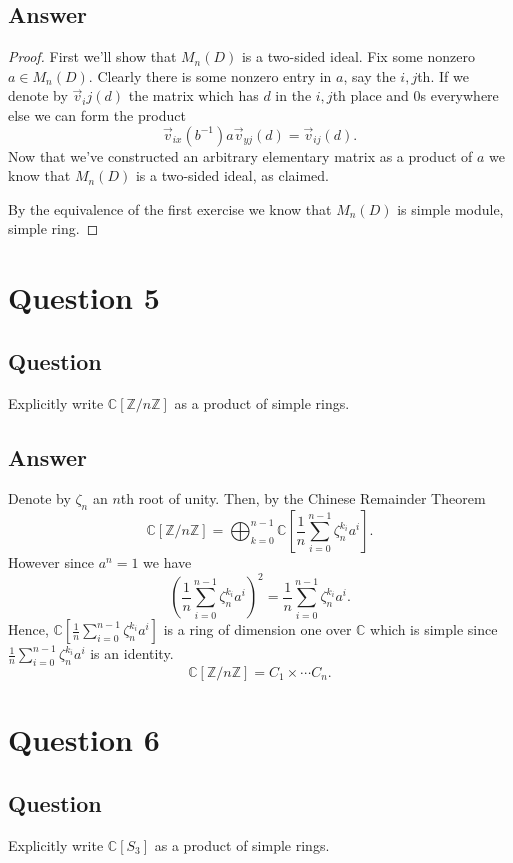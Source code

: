 \documentclass[11pt]{article}
\begin{document}
\subsection{Answer}
\begin{proof}
First we'll show that $M_n (D) $ is a two-sided ideal.  Fix some nonzero $a \in M_n(D)$. Clearly there is some nonzero entry in $a$, say the $i,j$th. If we denote by $\vec{v}_ij(d) $ the matrix which has $d$ in the $i,j$th place and 0s everywhere else we can form the product
\[\vec{v}_{ix}(b^{-1}) a \vec{v}_{yj}(d) = \vec{v}_{ij}(d).\]
Now that we've constructed an arbitrary elementary matrix as a product of $a$ we know that $M_n(D)$ is a two-sided ideal, as claimed.

By the equivalence of the first exercise we know that $M_n(D)$ is simple module, simple ring.
\end{proof}

\section{Question 5}
\subsection{Question}
Explicitly write $\mathbb{C}[\mathbb{Z}/n \mathbb{Z}]$ as a product of simple rings.
\subsection{Answer}
Denote by $\zeta_n$ an $n$th root of unity. Then, by the Chinese Remainder Theorem
\[\mathbb{C}[\mathbb{Z}/n\mathbb{Z}] = \bigoplus_{k=0}^{n-1} \mathbb{C} \left[\frac{1}{n} \sum_{i=0}^{n-1} \zeta_n^{k_i} a^i\right].\]
However since $a^n=1$ we have
\[ \left(\frac{1}{n} \sum_{i=0}^{n-1} \zeta_n^{k_i} a^i\right)^2 = \frac{1}{n} \sum_{i=0}^{n-1} \zeta_n^{k_i} a^i .\]
Hence, $\mathbb{C} \left[\frac{1}{n} \sum_{i=0}^{n-1} \zeta_n^{k_i} a^i\right]$ is  a ring of dimension one over $\mathbb{C}$ which is simple since $\frac{1}{n} \sum_{i=0}^{n-1} \zeta_n^{k_i} a^i$ is an identity. 
\[\mathbb{C}[\mathbb{Z}/n\mathbb{Z}] = C_1 \times \cdots C_n. \]

\section{Question 6}
\subsection{Question}
Explicitly write $\mathbb{C}[S_3]$ as a product of simple rings.
\end{document}
